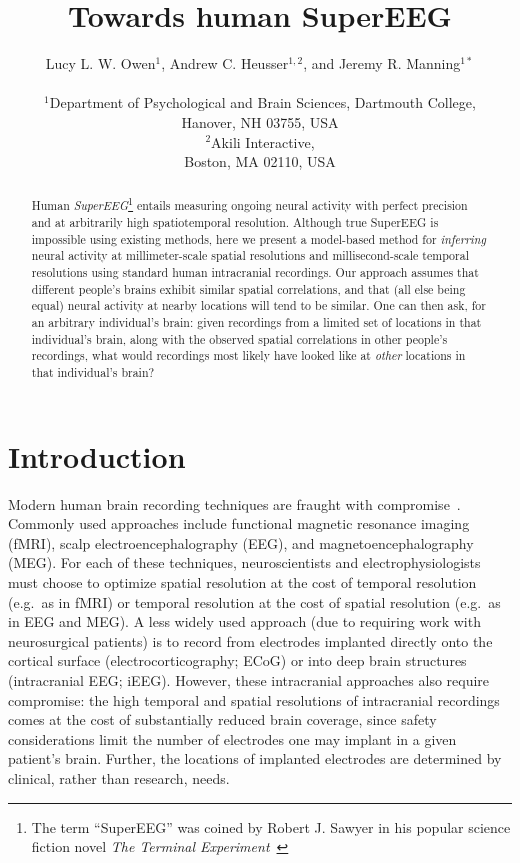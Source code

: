 \documentclass[11pt]{article}
\title{Towards human SuperEEG}
\author
{Lucy L. W. Owen$^{1}$, Andrew C. Heusser$^{1, 2}$, and Jeremy R. Manning$^{1\ast}$\\\\
$^{1}$Department of Psychological and Brain Sciences, Dartmouth College,\\
Hanover, NH 03755, USA\\
$^{2}$Akili Interactive,\\
Boston, MA 02110, USA}
\date{}
\begin{document}
 


\baselineskip24pt


\maketitle 

\begin{abstract}
  Human \textit{SuperEEG}\footnote{The term ``SuperEEG'' was coined by
    Robert J. Sawyer in his popular science fiction novel \textit{The
      Terminal Experiment}~\cite{Sawy95}} entails measuring ongoing
  neural activity with perfect precision and at arbitrarily high
  spatiotemporal resolution.  Although true SuperEEG is impossible
  using existing methods, here we present a model-based method for
  \textit{inferring} neural activity at millimeter-scale spatial
  resolutions and millisecond-scale temporal resolutions using
  standard human intracranial recordings.  Our approach assumes that
  different people's brains exhibit similar spatial correlations, and
  that (all else being equal) neural activity at nearby locations will
  tend to be similar.  One can then ask, for an arbitrary individual's
  brain: given recordings from a limited set of locations in that
  individual's brain, along with the observed spatial correlations in
  other people's recordings, what would recordings most likely have
  looked like at \textit{other} locations in that individual's brain?
\end{abstract}

\section*{Introduction}
Modern human brain recording techniques are fraught with
compromise~\citep{SejnEtal14}.  Commonly used approaches include
functional magnetic resonance imaging (fMRI), scalp
electroencephalography (EEG), and magnetoencephalography (MEG).  For
each of these techniques, neuroscientists and electrophysiologists
must choose to optimize spatial resolution at the cost of temporal
resolution (e.g.\ as in fMRI) or temporal resolution at the cost of
spatial resolution (e.g.\ as in EEG and MEG).  A less widely used
approach (due to requiring work with neurosurgical patients) is to
record from electrodes implanted directly onto the cortical surface
(electrocorticography; ECoG) or into deep brain structures
(intracranial EEG; iEEG).  However, these intracranial approaches also
require compromise: the high temporal and spatial resolutions of
intracranial recordings comes at the cost of substantially reduced
brain coverage, since safety considerations limit the number of
electrodes one may implant in a given patient's brain.  Further, the
locations of implanted electrodes are determined by clinical, rather
than research, needs.
\end{document}
